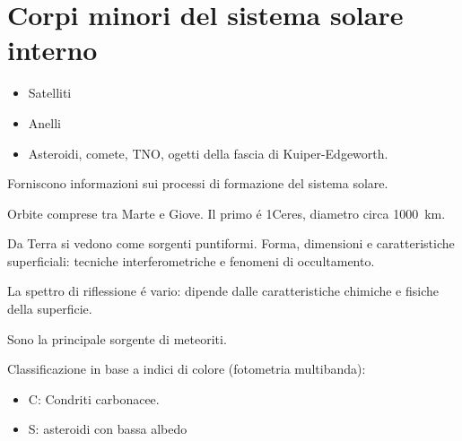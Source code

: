\section{Corpi minori del sistema solare interno}

\begin{itemize}
    \item Satelliti
    \item Anelli
    \item Asteroidi, comete, TNO, ogetti della fascia di Kuiper-Edgeworth.
\end{itemize}

Forniscono informazioni sui processi di formazione del sistema solare.


Orbite comprese tra Marte e Giove. Il primo \'e 1Ceres, diametro circa \SI{1000}{\kilo\meter}.

Da Terra si vedono come sorgenti puntiformi. Forma, dimensioni e caratteristiche superficiali: tecniche interferometriche e fenomeni di occultamento.

La spettro di riflessione \'e vario: dipende dalle caratteristiche chimiche e fisiche della superficie.

Sono la principale sorgente di meteoriti.

Classificazione in base a indici di colore (fotometria multibanda):
\begin{itemize}
    \item C: Condriti carbonacee.
    \item S: asteroidi con bassa albedo
\end{itemize}

